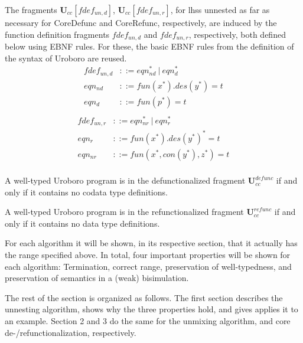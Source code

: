 \begin{definition}
The fragments $\mathbf{U}_{cc}[fdef_{un,d}]$, $\mathbf{U}_{cc}[fdef_{un,r}]$, for lhss unnested as far as necessary for \textsf{CoreDefunc} and \textsf{CoreRefunc}, respectively, are induced by the function definition fragments $fdef_{un,d}$ and $fdef_{un,r}$, respectively, both defined below using EBNF rules. For these, the basic EBNF rules from the definition of the syntax of Uroboro are reused.
\begin{align*}
fdef_{un,d} &::= eqn_{nd}^* ~ | ~ eqn_d^* \\
eqn_{nd} &::= fun(x^*).des(y^*) = t \\
eqn_d &::= fun(p^*) = t \\
\end{align*}
\begin{align*}
fdef_{un,r} &::= eqn_{nr}^* ~ | ~ eqn_r^* \\
eqn_r &::= fun(x^*).des(y^*)^* = t \\
eqn_{nr} &::= fun(x^*, con(y^*), z^*) = t \\
\end{align*}
\end{definition}

\begin{definition}
A well-typed Uroboro program is in the defunctionalized fragment $\mathbf{U}^{defunc}_{cc}$ if and only if it contains no codata type definitions.
\end{definition}

\begin{definition}
A well-typed Uroboro program is in the refunctionalized fragment $\mathbf{U}^{refunc}_{cc}$ if and only if it contains no data type definitions.
\end{definition}

For each algorithm it will be shown, in its respective section, that it actually has the range specified above. In total, four important properties will be shown for each algorithm: Termination, correct range, preservation of well-typedness, and preservation of semantics in a (weak) bisimulation.

The rest of the section is organized as follows. The first section describes the unnesting algorithm, shows why the three properties hold, and gives applies it to an example. Section 2 and 3 do the same for the unmixing algorithm, and core de-/refunctionalization, respectively.

